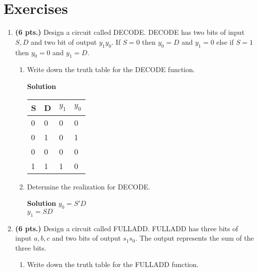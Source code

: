 \section{Exercises}
\label{section:minimizationExercises}
\graphicspath{ {./chapter03/FigHw} }

\begin{enumerate}
    \item \textbf{ (6 pts.)} Design a circuit called DECODE.  DECODE has two bits of
        input $S, D$ and two bit of output $y_1 y_0$.  If $S=0$ then $y_0=D$ and
        $y_1=0$ else if $S=1$ then $y_0=0$ and $y_1 = D$.
        \begin{enumerate}
            \item Write down the truth table for the DECODE function.

                \begin{onlysolution}  \textbf{Solution} \itshape{
                        \begin{tabular}{l|l||l|l}
                            S & D & $y_1$ & $y_0$ \\ \hline
                            0 & 0 & 0   & 0   \\ \hline
                            0 & 1 & 0   & 1   \\ \hline
                            0 & 0 & 0   & 0   \\ \hline
                            1 & 1 & 1   & 0   \\
                        \end{tabular}
                    }
                \end{onlysolution}
            \item Determine the \SOPmin realization for DECODE.

                \begin{onlysolution}  \textbf{Solution} \itshape{
                        $y_0 = S'D$\\
                        $y_1 = S D$
                    }
                \end{onlysolution}
        \end{enumerate}

    \item \textbf{ (6 pts.)} Design a circuit called FULLADD.  FULLADD has
        three bits of input $a,b,c$ and two bits of output $s_1 s_0$.  The output
        represents the sum of the three bits.
        \begin{enumerate}
            \item Write down the truth table for the FULLADD function.


\end{enumerate}
\end{enumerate}

